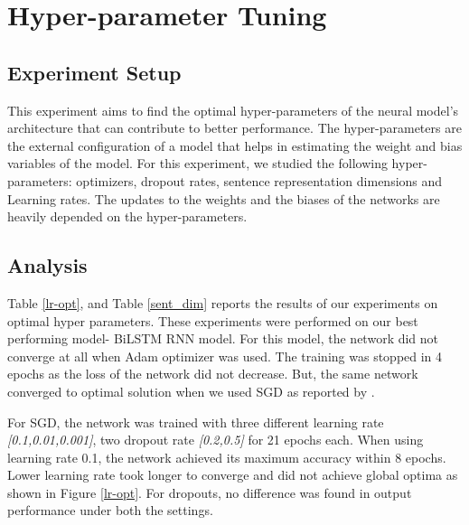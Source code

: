 \documentclass[12pt]{report} %
\begin{document}
\section{Hyper-parameter Tuning}
\label{parameter-tune}

\subsection{Experiment Setup}
This experiment aims to find the optimal hyper-parameters of the neural model's architecture that can contribute to better performance. The hyper-parameters are the external configuration of a model that helps in estimating the weight and bias variables of the model. For this experiment, we studied the following hyper-parameters: optimizers, dropout rates, sentence representation dimensions and Learning rates. The updates to the  weights and the biases of the networks are heavily depended on the hyper-parameters.

\subsection{Analysis}

Table \ref{lr-opt}, and Table \ref{sent_dim} reports the results of our experiments on optimal hyper parameters. These experiments were performed on our best performing model- BiLSTM RNN model. For this model, the network did not converge at all when Adam optimizer was used. The training was stopped in 4 epochs as the loss of the network did not decrease.  But, the same network converged to optimal solution when we used SGD as reported by \cite{conneau2017supervised}. 

For SGD, the network was trained with three different learning rate \textit{[0.1,0.01,0.001]}, two dropout rate \textit{[0.2,0.5]} for 21 epochs each. When using learning rate 0.1,  the network achieved its maximum accuracy within 8 epochs. Lower learning rate took longer to converge and did not achieve global optima as shown in Figure \ref{lr-opt}. For dropouts, no difference was found in output performance under both the settings.

%

\end{document}
